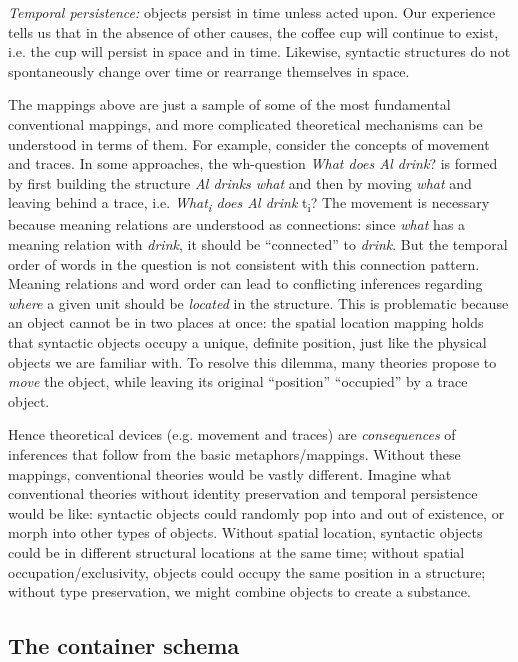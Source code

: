 \textit{Temporal persistence:} objects persist in time unless acted upon. Our experience tells us that in the absence of other causes, the coffee cup will continue to exist, i.e. the cup will persist in space and in time. Likewise, syntactic structures do not spontaneously change over time or rearrange themselves in space.

  The mappings above are just a sample of some of the most fundamental conventional mappings, and more complicated theoretical mechanisms can be understood in terms of them. For example, consider the concepts of movement and traces. In some approaches, the wh-question \textit{What does Al drink}? is formed by first building the structure \textit{Al drinks what} and then by moving \textit{what} and leaving behind a trace, i.e. \textit{What\textsubscript{i} does Al drink} t\textsubscript{i}? The movement is necessary because meaning relations are understood as connections: since \textit{what} has a meaning relation with \textit{drink}, it should be “connected” to \textit{drink}. But the temporal order of words in the question is not consistent with this connection pattern. Meaning relations and word order can lead to conflicting inferences regarding \textit{where} a given unit should be \textit{located} in the structure. This is problematic because an object cannot be in two places at once: the spatial location mapping holds that syntactic objects occupy a unique, definite position, just like the physical objects we are familiar with. To resolve this dilemma, many theories propose to \textit{move} the object, while leaving its original “position” “occupied” by a trace object.

  Hence theoretical devices (e.g. movement and traces) are \textit{consequences} of inferences that follow from the basic metaphors/mappings. Without these mappings, conventional theories would be vastly different. Imagine what conventional theories without identity preservation and temporal persistence would be like: syntactic objects could randomly pop into and out of existence, or morph into other types of objects. Without spatial location, syntactic objects could be in different structural locations at the same time; without spatial occupation/exclusivity, objects could occupy the same position in a structure; without type preservation, we might combine objects to create a substance.

\subsection{The container schema} 

